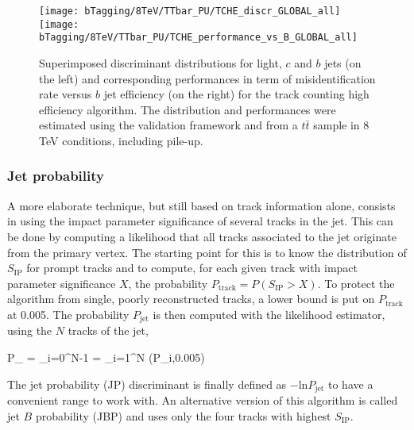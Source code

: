     \begin{figure}[th!]
        \centering
        \begin{minipage}{\textwidth}
        \texttt{[image: bTagging/8TeV/TTbar\_PU/TCHE\_discr\_GLOBAL\_all]}
        \texttt{[image: bTagging/8TeV/TTbar\_PU/TCHE\_performance\_vs\_B\_GLOBAL\_all]}
        \end{minipage}
        \caption{Superimposed discriminant distributions for light, $c$ and $b$ jets (on
        the left) and corresponding performances in term of misidentification rate versus $b$ jet efficiency
        (on the right) for the track counting high efficiency algorithm.
        The distribution and performances were estimated using the validation framework and from
        a $t\bar{t}$ sample in 8 TeV conditions, including pile-up.}
        \label{fig:bTagging/perfTC}
    \end{figure}

        \subsubsection{Jet probability}

    A more elaborate technique, but still based on track information alone, consists in
    using the impact parameter significance of
    several tracks in the jet. This can be done by computing a likelihood that all tracks
    associated to the jet originate from the primary vertex. The starting point for this
    is to know the distribution of $S_\text{IP}$ for prompt tracks and to compute, for
    each given track with impact parameter significance $X$, the probability $P_\text{track} =
    P(S_\text{IP} > X)$. To protect the algorithm from single, poorly reconstructed tracks,
    a lower bound is put on $P_\text{track}$ at 0.005. The probability $P_\text{jet}$ is
    then computed with the likelihood estimator, using the $N$ tracks of the jet,

    {
        P_ = \Pi \cdot \sum_{i=0}^{N-1}   \Pi = \prod_{i=1}^{N} (P_{i},0.005)
    }

    The jet probability (JP) discriminant is finally defined as $- \text{ln} P_\text{jet}$
    to have a convenient range to work with. An alternative version of this algorithm is
    called jet $B$ probability (JBP) and uses only the four tracks with highest $S_\text{IP}$.

